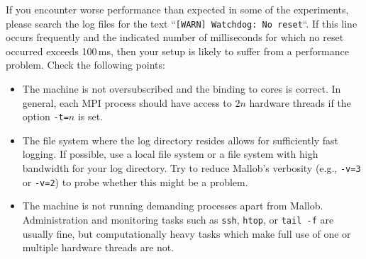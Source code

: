 \documentclass[runningheads]{article}
\numberwithin{dummy}{subsection}
\begin{document}
If you encounter worse performance than expected in some of the experiments, please search the log files for the text ``\texttt{[WARN] Watchdog: No reset}``.
If this line occurs frequently and the indicated number of milliseconds for which no reset occurred exceeds 100\,ms, then your setup is likely to suffer from a performance problem.
Check the following points:
\begin{itemize}
\item The machine is not oversubscribed and the binding to cores is correct. In general, each MPI process should have access to $2n$ hardware threads if the option \texttt{-t=}$n$ is set.
\item The file system where the log directory resides allows for sufficiently fast logging. If possible, use a local file system or a file system with high bandwidth for your log directory. Try to reduce Mallob's verbosity (e.g., \texttt{-v=3} or \texttt{-v=2}) to probe whether this might be a problem.
\item The machine is not running demanding processes apart from Mallob.
Administration and monitoring tasks such as \texttt{ssh}, \texttt{htop}, or \texttt{tail -f} are usually fine, but computationally heavy tasks which make full use of one or multiple hardware threads are not.
\end{itemize}





%
%
%
%
%
%
\end{document}

